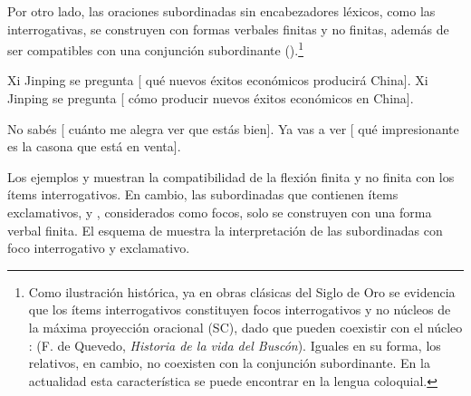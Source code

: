 Por otro lado, las oraciones subordinadas sin encabezadores léxicos, como las
interrogativas, se construyen con formas verbales finitas y no finitas, además de
ser compatibles con una conjunción subordinante
().\footnote{Como ilustración histórica, ya en obras clásicas del Siglo
de Oro se evidencia que los ítems interrogativos constituyen focos
interrogativos y no núcleos de la máxima proyección oracional (SC), dado que
pueden coexistir con el núcleo :  (F. de Quevedo, \textit{Historia de
la vida del Buscón}). Iguales en su forma, los relativos, en cambio, no coexisten
con la conjunción subordinante. En la actualidad esta característica se puede
encontrar en la lengua coloquial.}

\begin{exe}
  \ex\label{ex:13-interr}
    \begin{xlist}
      \ex\label{ex:13-interr-a} Xi Jinping se pregunta [ qué nuevos
          éxitos económicos producirá China].
      \ex\label{ex:13-interr-b} Xi Jinping se pregunta [ cómo producir
          nuevos éxitos económicos en China].
    \end{xlist}
  \ex\label{ex:13-excl}
    \begin{xlist}
      \ex\label{ex:13-excl-a} No sabés [ cuánto me alegra ver que estás
          bien].
      \ex\label{ex:13-excl-b} Ya vas a ver [ qué impresionante es la
          casona que está en venta].
    \end{xlist}
\end{exe}

Los ejemplos  y  muestran la
compatibilidad de la flexión finita y no finita con los ítems interrogativos. En
cambio, las subordinadas que contienen ítems exclamativos,  y
, considerados como focos, solo se construyen con una forma
verbal finita. El esquema de  muestra la interpretación de las
subordinadas con foco interrogativo y exclamativo.

